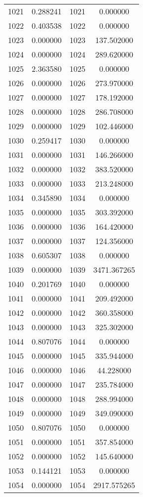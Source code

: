 \documentclass[12pt]{article}
\begin{document}
\begin{longtable}{@{}cccc@{}}
1021 & 0.288241 & 1021 & 0.000000 \\
1022 & 0.403538 & 1022 & 0.000000 \\
1023 & 0.000000 & 1023 & 137.502000 \\
1024 & 0.000000 & 1024 & 289.620000 \\
1025 & 2.363580 & 1025 & 0.000000 \\
1026 & 0.000000 & 1026 & 273.970000 \\
1027 & 0.000000 & 1027 & 178.192000 \\
1028 & 0.000000 & 1028 & 286.708000 \\
1029 & 0.000000 & 1029 & 102.446000 \\
1030 & 0.259417 & 1030 & 0.000000 \\
1031 & 0.000000 & 1031 & 146.266000 \\
1032 & 0.000000 & 1032 & 383.520000 \\
1033 & 0.000000 & 1033 & 213.248000 \\
1034 & 0.345890 & 1034 & 0.000000 \\
1035 & 0.000000 & 1035 & 303.392000 \\
1036 & 0.000000 & 1036 & 164.420000 \\
1037 & 0.000000 & 1037 & 124.356000 \\
1038 & 0.605307 & 1038 & 0.000000 \\
1039 & 0.000000 & 1039 & 3471.367265 \\
1040 & 0.201769 & 1040 & 0.000000 \\
1041 & 0.000000 & 1041 & 209.492000 \\
1042 & 0.000000 & 1042 & 360.358000 \\
1043 & 0.000000 & 1043 & 325.302000 \\
1044 & 0.807076 & 1044 & 0.000000 \\
1045 & 0.000000 & 1045 & 335.944000 \\
1046 & 0.000000 & 1046 & 44.228000 \\
1047 & 0.000000 & 1047 & 235.784000 \\
1048 & 0.000000 & 1048 & 288.994000 \\
1049 & 0.000000 & 1049 & 349.090000 \\
1050 & 0.807076 & 1050 & 0.000000 \\
1051 & 0.000000 & 1051 & 357.854000 \\
1052 & 0.000000 & 1052 & 145.640000 \\
1053 & 0.144121 & 1053 & 0.000000 \\
1054 & 0.000000 & 1054 & 2917.575265 \\

\end{longtable}
\end{document}
